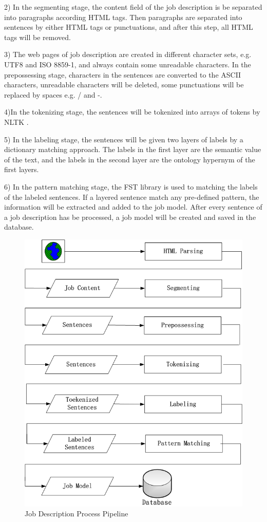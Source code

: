 2) In the segmenting stage, the content field of the job description is be separated into paragraphs according HTML tags. Then paragraphs are separated into sentences by either HTML tags or punctuations, and after this step, all HTML tags will be removed.

3) The web pages of job description are created in different character sets, e.g. UTF8 and ISO 8859-1, and always contain some unreadable characters. In the prepossessing stage, characters in the sentences are converted to the ASCII characters, unreadable characters will be deleted, some punctuations will be replaced by spaces e.g. / and -.

4)In the tokenizing stage, the sentences will be tokenized into arrays of tokens by NLTK \cite{bird2006nltk}.

5) In the labeling stage, the sentences will be given two layers of labels by a dictionary matching approach. The labels in the first layer are the semantic value of the text, and the labels in the second layer are the ontology hypernym of the first layers.

6) In the pattern matching stage,  the FST library is used to matching the labels of the labeled sentences.  If a layered sentence match any pre-defined pattern, the information will be extracted and added to the job model. After every sentence of a job description has be processed, a job model will be created and saved in the database.

\begin{figure}[htbp]
  \centering
  \includegraphics[scale=0.4]{images/pipeline2.png}
  \caption{Job Description Process Pipeline}
  \label{fig:Pipeline}
\end{figure}

